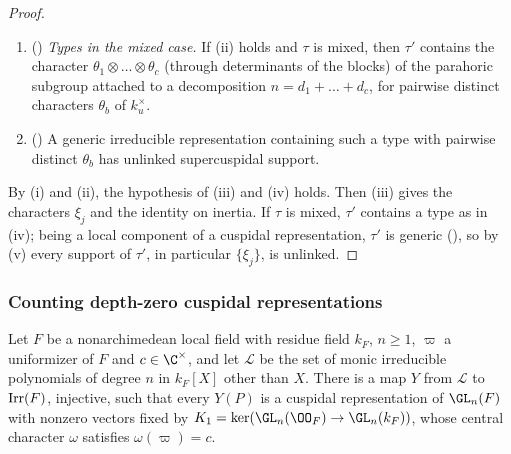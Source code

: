\begin{proof}
\begin{enumerate}[label=(\roman*),nosep]
  a cuspidal character of $\GL_m(\F_q)$ to $\GL_m(\F_{q^f})$, $m\mid f$, is orthogonal to all products of cuspidal
  characters of proper Levi subgroups, ), and the type law
  (L12) for the local parameter maps.
\item () \emph{Types in the mixed case.} If (ii) holds and $\tau$ is
  mixed, then $\tau'$ contains the character $\theta_1\otimes\dots\otimes\theta_c$ (through determinants of the blocks) of
  the parahoric subgroup attached to a decomposition $n=d_1+\dots+d_c$, for pairwise distinct characters $\theta_b$ of
  $k_u^\times$.
\item () A generic irreducible representation containing such
  a type with pairwise distinct $\theta_b$ has unlinked supercuspidal support.
\end{enumerate}
By (i) and (ii), the hypothesis of (iii) and (iv) holds. Then (iii) gives the characters $\xi_j$ and the identity on
inertia. If $\tau$ is mixed, $\tau'$ contains a type as in (iv); being a local component of a cuspidal representation,
$\tau'$ is generic (), so by (v) every support of $\tau'$, in
particular $\{\xi_j\}$, is unlinked.
\end{proof}

\subsubsection{Counting depth-zero cuspidal representations}

\begin{proposition}\label{pf:galred:dzcount}
Let $F$ be a nonarchimedean local field with residue field $k_F$, $n\ge1$, $\varpi$ a uniformizer of $F$ and
$c\in\C^\times$, and let $\mathcal L$ be the set of monic irreducible polynomials of degree $n$ in $k_F[X]$ other than
$X$. There is a map $Y$ from $\mathcal L$ to $\operatorname{Irr}(F)$, injective, such that every $Y(P)$ is a cuspidal
representation of $\GL_n(F)$ with nonzero vectors fixed by $K_1=\ker(\GL_n(\OO_F)\to\GL_n(k_F))$, whose central character
$\omega$ satisfies $\omega(\varpi)=c$.
\end{proposition}

